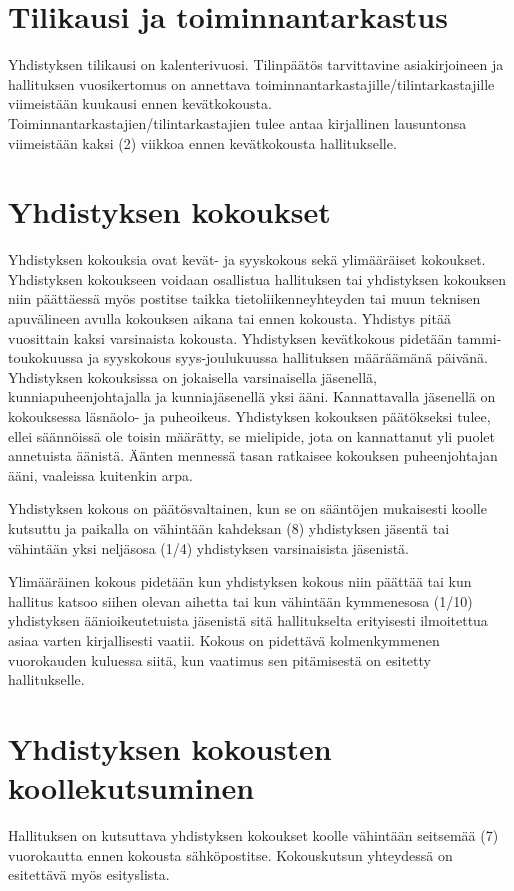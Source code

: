 \documentclass[a4paper, 12pt, finnish]{scrartcl}
\begin{document}
\section{Tilikausi ja toiminnantarkastus}
Yhdistyksen tilikausi on kalenterivuosi.
Tilinpäätös tarvittavine asiakirjoineen ja hallituksen vuosikertomus on annettava toiminnantarkastajille/tilintarkastajille viimeistään kuukausi ennen kevätkokousta.
Toiminnantarkastajien/tilintarkastajien tulee antaa kirjallinen lausuntonsa viimeistään kaksi (2) viikkoa ennen kevätkokousta hallitukselle.

\section{Yhdistyksen kokoukset}
Yhdistyksen kokouksia ovat kevät- ja syyskokous sekä ylimääräiset kokoukset.
Yhdistyksen kokoukseen voidaan osallistua hallituksen tai yhdistyksen kokouksen niin päättäessä myös postitse taikka tietoliikenneyhteyden tai muun teknisen apuvälineen avulla kokouksen aikana tai ennen kokousta.
Yhdistys pitää vuosittain kaksi varsinaista kokousta.
Yhdistyksen kevätkokous pidetään tammi-toukokuussa ja syyskokous syys-joulukuussa hallituksen määräämänä päivänä.
Yhdistyksen kokouksissa on jokaisella varsinaisella jäsenellä, kunniapuheenjohtajalla ja kunniajäsenellä yksi ääni.
Kannattavalla jäsenellä on kokouksessa läsnäolo- ja puheoikeus.
Yhdistyksen kokouksen päätökseksi tulee, ellei säännöissä ole toisin määrätty, se mielipide, jota on kannattanut yli puolet annetuista äänistä.
Äänten mennessä tasan ratkaisee kokouksen puheenjohtajan ääni, vaaleissa kuitenkin arpa.

Yhdistyksen kokous on päätösvaltainen, kun se on sääntöjen mukaisesti koolle kutsuttu ja paikalla on vähintään kahdeksan (8) yhdistyksen jäsentä tai vähintään yksi neljäsosa (1/4) yhdistyksen varsinaisista jäsenistä.

Ylimääräinen kokous pidetään kun yhdistyksen kokous niin päättää tai kun hallitus katsoo siihen olevan aihetta tai kun vähintään kymmenesosa (1/10) yhdistyksen äänioikeutetuista jäsenistä sitä hallitukselta erityisesti ilmoitettua asiaa varten kirjallisesti vaatii.
Kokous on pidettävä kolmenkymmenen vuorokauden kuluessa siitä, kun vaatimus sen pitämisestä on esitetty hallitukselle.

\section{Yhdistyksen kokousten koollekutsuminen}
Hallituksen on kutsuttava yhdistyksen kokoukset koolle vähintään seitsemää (7) vuorokautta ennen kokousta sähköpostitse.
Kokouskutsun yhteydessä on esitettävä myös esityslista.
\end{document}
